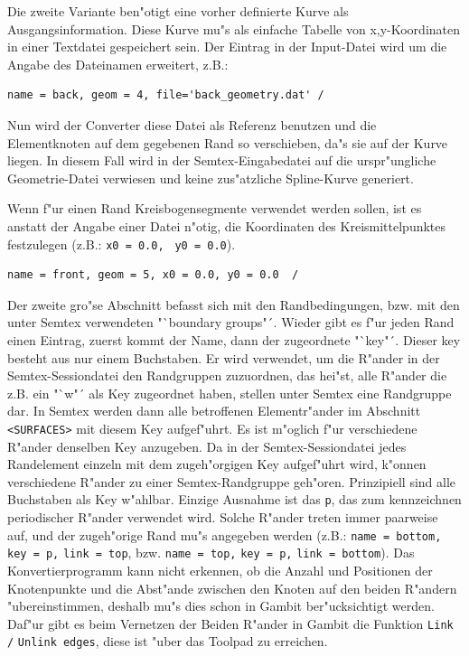 \documentclass{article}
\begin{document}
Die zweite Variante ben"otigt eine vorher definierte Kurve als Ausgangsinformation. Diese Kurve mu"s als einfache Tabelle von x,y-Koordinaten in einer Textdatei gespeichert sein. Der Eintrag in der Input-Datei wird um die Angabe des Dateinamen erweitert, z.B.:

\begin{verbatim}
name = back, geom = 4, file='back_geometry.dat' /
\end{verbatim}

Nun wird der Converter diese Datei als Referenz benutzen und die Elementknoten auf dem gegebenen Rand so verschieben, da"s sie auf der Kurve liegen. In diesem Fall wird in der Semtex-Eingabedatei auf die urspr"ungliche Geometrie-Datei verwiesen und keine zus"atzliche Spline-Kurve generiert.

Wenn f"ur einen Rand Kreisbogensegmente verwendet werden sollen, ist es anstatt der Angabe einer Datei n"otig, die Koordinaten des Kreismittelpunktes festzulegen (z.B.: \verb|x0 = 0.0,| \verb| y0 = 0.0|).

\begin{verbatim}
name = front, geom = 5, x0 = 0.0, y0 = 0.0  /
\end{verbatim}

Der zweite gro"se Abschnitt befasst sich mit den Randbedingungen, bzw. mit den unter Semtex verwendeten "`boundary groups"´. Wieder gibt es f"ur jeden Rand einen Eintrag, zuerst kommt der Name, dann der zugeordnete "`key"´. Dieser key besteht aus nur einem Buchstaben. Er wird verwendet, um die R"ander in der Semtex-Sessiondatei den Randgruppen zuzuordnen, das hei"st, alle R"ander die z.B. ein "`w"´ als Key zugeordnet haben, stellen unter Semtex eine Randgruppe dar. In Semtex werden dann alle betroffenen Elementr"ander im Abschnitt \verb|<SURFACES>| mit diesem Key aufgef"uhrt.
Es ist m"oglich f"ur verschiedene R"ander denselben Key anzugeben. Da in der Semtex-Sessiondatei jedes Randelement einzeln mit dem zugeh"orgigen Key aufgef"uhrt wird, k"onnen verschiedene R"ander zu einer Semtex-Randgruppe geh"oren.
Prinzipiell sind alle Buchstaben als Key w"ahlbar. Einzige Ausnahme ist das \verb|p|, das zum kennzeichnen periodischer R"ander verwendet wird. Solche R"ander treten immer paarweise auf, und der zugeh"orige Rand mu"s angegeben werden 
(z.B.: \verb|name = bottom,| \verb|key = p,| \verb|link = top|, bzw. \verb|name = top,| \verb|key = p,| \verb|link = bottom|). Das Konvertierprogramm kann nicht erkennen, ob die Anzahl und Positionen der Knotenpunkte und die Abst"ande zwischen den Knoten auf den beiden R"andern "ubereinstimmen, deshalb mu"s dies schon in Gambit ber"ucksichtigt werden. Daf"ur gibt es beim Vernetzen der Beiden R"ander in Gambit die Funktion \verb|Link /| \verb|Unlink edges|, diese ist "uber das Toolpad zu erreichen.
\end{document}
